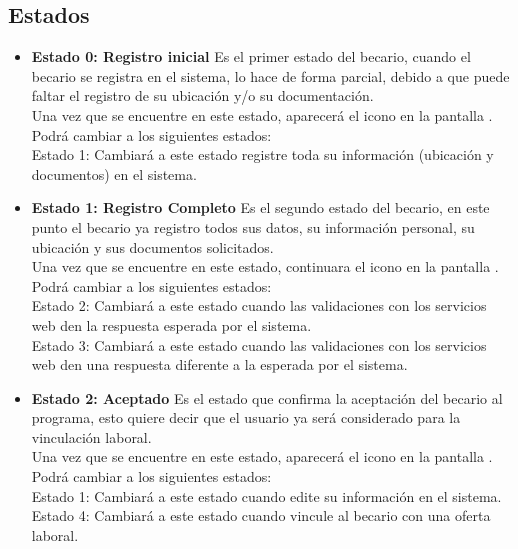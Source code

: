 \subsection{Estados}
	\begin{itemize} 
        \item \textbf{Estado 0: Registro inicial}
        Es el primer estado del becario, cuando el becario se registra en el sistema, lo hace de forma parcial, debido a que puede faltar el registro de su ubicación y/o su documentación.\\
        
        Una vez que se encuentre en este estado, aparecerá el icono \faExclamationCircle en la pantalla .\\
         Podrá cambiar a los siguientes estados:\\
        Estado 1: Cambiará a este estado registre toda su información (ubicación y documentos) en el sistema.
         
        \item \textbf{Estado 1: Registro Completo} 
         Es el segundo estado del becario, en este punto el becario ya registro todos sus datos, su información personal, su ubicación y sus documentos solicitados. \\
          Una vez que se encuentre en este estado, continuara el icono \faExclamationCircle en la pantalla .
           Podrá cambiar a los siguientes estados:\\
        Estado 2: Cambiará a este estado cuando las validaciones con los servicios web den la respuesta esperada por el sistema.\\
        Estado 3: Cambiará a este estado cuando las validaciones con los servicios web den una respuesta diferente a la esperada por el sistema.
        
        \item \textbf{Estado 2: Aceptado} 
        Es el estado que confirma la aceptación del becario al programa, esto quiere decir que el usuario ya será considerado para la vinculación laboral.\\
        Una vez que se encuentre en este estado, aparecerá el icono \faCheckCircle en la pantalla .\\
        Podrá cambiar a los siguientes estados:\\
        Estado 1: Cambiará a este estado cuando edite su información en el sistema.
         Estado 4: Cambiará a este estado cuando vincule al becario con una oferta laboral.
        

\end{itemize}
